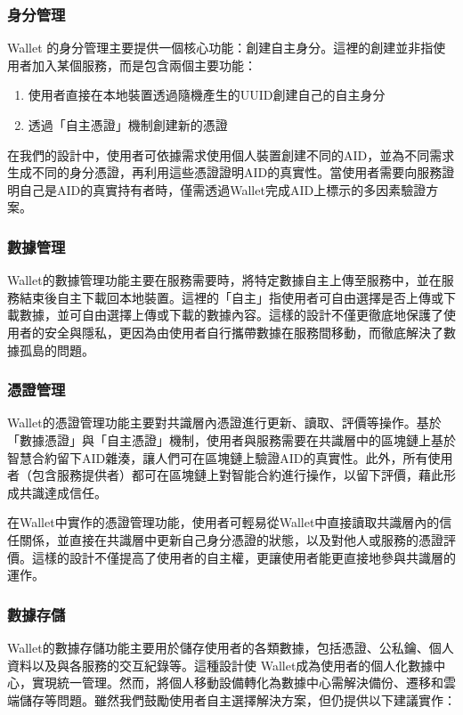 \subsubsection{身分管理}
Wallet 的身分管理主要提供一個核心功能：創建自主身分。這裡的創建並非指使用者加入某個服務，而是包含兩個主要功能：
\begin{enumerate}
  \item 使用者直接在本地裝置透過隨機產生的UUID創建自己的自主身分
  \item 透過「自主憑證」機制創建新的憑證
\end{enumerate}
在我們的設計中，使用者可依據需求使用個人裝置創建不同的AID，並為不同需求生成不同的身分憑證，再利用這些憑證證明AID的真實性。當使用者需要向服務證明自己是AID的真實持有者時，僅需透過Wallet完成AID上標示的多因素驗證方案。
\subsubsection{數據管理}
Wallet的數據管理功能主要在服務需要時，將特定數據自主上傳至服務中，並在服務結束後自主下載回本地裝置。這裡的「自主」指使用者可自由選擇是否上傳或下載數據，並可自由選擇上傳或下載的數據內容。這樣的設計不僅更徹底地保護了使用者的安全與隱私，更因為由使用者自行攜帶數據在服務間移動，而徹底解決了數據孤島的問題。
\subsubsection{憑證管理}
Wallet的憑證管理功能主要對共識層內憑證進行更新、讀取、評價等操作。基於「數據憑證」與「自主憑證」機制，使用者與服務需要在共識層中的區塊鏈上基於智慧合約留下AID雜湊，讓人們可在區塊鏈上驗證AID的真實性。此外，所有使用者（包含服務提供者）都可在區塊鏈上對智能合約進行操作，以留下評價，藉此形成共識達成信任。

在Wallet中實作的憑證管理功能，使用者可輕易從Wallet中直接讀取共識層內的信任關係，並直接在共識層中更新自己身分憑證的狀態，以及對他人或服務的憑證評價。這樣的設計不僅提高了使用者的自主權，更讓使用者能更直接地參與共識層的運作。
\subsubsection{數據存儲}
Wallet的數據存儲功能主要用於儲存使用者的各類數據，包括憑證、公私鑰、個人資料以及與各服務的交互紀錄等。這種設計使 Wallet成為使用者的個人化數據中心，實現統一管理。然而，將個人移動設備轉化為數據中心需解決備份、遷移和雲端儲存等問題。雖然我們鼓勵使用者自主選擇解決方案，但仍提供以下建議實作：

